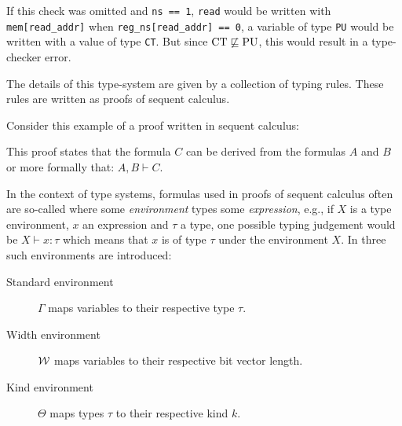 \begin{example}
    If this check was omitted and \lstinline{ns == 1}, \lstinline{read} would be written with \lstinline{mem[read_addr]} when \lstinline{reg_ns[read_addr] == 0}, a variable of type \lstinline{PU} would be written with a value of type \lstinline{CT}.
    But since $ \CT \not \sqsubseteq \PU $, this would result in a type-checker error.
\end{example}

The details of this type-system are given by a collection of typing rules.
These rules are written as proofs of sequent calculus.

\begin{example}
    Consider this example of a proof written in sequent calculus:
    \begin{prooftree}
    \end{prooftree}

    This proof states that the formula $ C $ can be derived from the formulas $ A $ and $ B $ or more formally that: $ A, B \vdash C $.
\end{example}

In the context of type systems, formulas used in proofs of sequent calculus often are so-called  where some \textit{environment} types some \textit{expression}, e.g., if $ X $ is a type environment, $ x $ an expression and $ \tau $ a type, one possible typing judgement would be $ X \vdash x : \tau $ which means that $ x $ is of type $ \tau $ under the environment $ X $.
In \cite{Ferraiuolo17} three such environments are introduced:

\begin{description}
    \item[Standard environment] $ \Gamma $ maps variables to their respective type $ \tau $.
    \item[Width environment] $ \W $ maps variables to their respective bit vector length.
    \item[Kind environment] $ \Theta $ maps types $ \tau $ to their respective kind $ k $.
\end{description}

